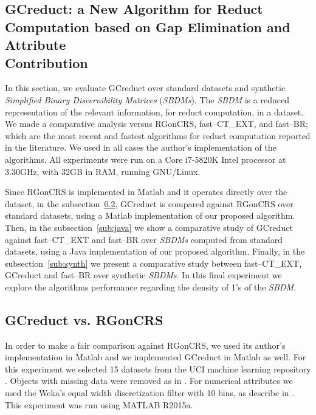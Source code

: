 \documentclass[authoryear,11pt]{elsarticle}
\begin{document}
\subsection{GCreduct: a New Algorithm for Reduct Computation based on Gap Elimination and Attribute\\ Contribution}\label{evaluation}
  In this section, we evaluate GCreduct over standard datasets \citep{Bache13} and synthetic \textit{Simplified Binary Discernibility Matrices} (\textit{SBDMs}). The \textit{SBDM} is a reduced representation of the relevant information, for reduct computation, in a dataset. We made a comparative analysis versus RGonCRS, fast--CT\_EXT, and fast--BR; which are the most recent and fastest algorithms for reduct computation reported in the literature. We used in all cases the author's implementation of the algorithms. All experiments were run on a Core i7-5820K Intel processor at 3.30GHz, with 32GB in RAM, running GNU/Linux.

  Since RGonCRS is implemented in Matlab and it operates directly over the dataset, in the subsection~\ref{sub:matlab}, GCreduct is compared against RGonCRS over standard datasets, using a Matlab implementation of our proposed algorithm. Then, in the subsection~\ref{sub:java} we show a comparative study of GCreduct against fast--CT\_EXT and fast--BR over \textit{SBDMs} computed from standard datasets, using a Java implementation of our proposed algorithm. Finally, in the subsection~\ref{sub:synth} we present a comparative study between fast--CT\_EXT, GCreduct and fast--BR over synthetic \textit{SBDMs}. In this final experiment we explore the algorithms performance regarding the density of 1's of the \textit{SBDM}.

\subsection{GCreduct vs. RGonCRS}\label{sub:matlab}
  In order to make a fair comparison against RGonCRS, we used its author's implementation in Matlab and we implemented GCreduct in Matlab as well. For this experiment we selected 15 datasets from the UCI machine learning repository \citep{Bache13}. Objects with missing data were removed as in \citep{WangP07}. For numerical attributes we used the Weka's equal width discretization filter with 10 bins, as describe in \cite{Flores2010}. This experiment was run using MATLAB R2015a.
\end{document}
